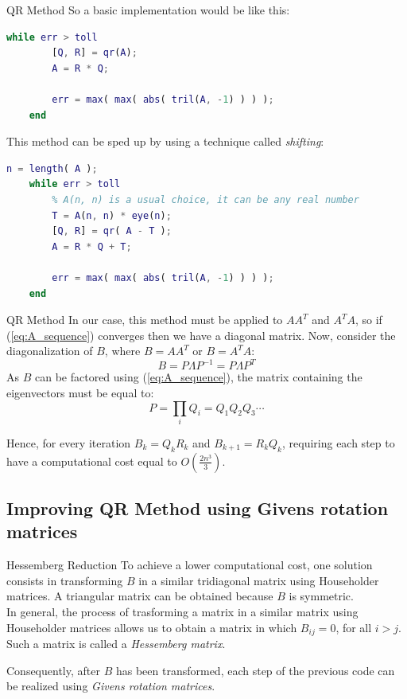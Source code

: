 \documentclass[10pt]{beamer}
\begin{document}
\begin{frame}[fragile]{QR Method}
    So a basic implementation would be like this:
    \begin{lstlisting}[language=Matlab]
    while err > toll
        [Q, R] = qr(A);
        A = R * Q;

        err = max( max( abs( tril(A, -1) ) ) );
    end \end{lstlisting}
    This method can be sped up by using a technique called \textit{shifting}:
    \begin{lstlisting}[language=Matlab]
    n = length( A );
    while err > toll
        % A(n, n) is a usual choice, it can be any real number
        T = A(n, n) * eye(n);
        [Q, R] = qr( A - T );
        A = R * Q + T;

        err = max( max( abs( tril(A, -1) ) ) );
    end \end{lstlisting}
\end{frame}

\begin{frame}{QR Method}
    In our case, this method must be applied to $A A^T$ and $A^T A$, so if (\ref{eq:A_sequence}) converges then we have a diagonal matrix. \newline
    Now, consider the diagonalization of $B$, where $B = A A^T$ or $B = A^T A$:
    $$
    B = P \Lambda P^{-1} =  P \Lambda P^T
    $$
    As $B$ can be factored using (\ref{eq:A_sequence}), the matrix containing the eigenvectors must be equal to:
    $$
    P = \prod_i Q_i = Q_1 Q_2 Q_3 \cdots
    $$ \bigskip

    Hence, for every iteration $B_k = Q_k R_k$ and $B_{k+1} = R_k Q_k$, requiring each step to have a computational cost equal to $O(\frac{2 n^3}{3})$.
\end{frame}

\subsection{Improving QR Method using Givens rotation matrices}

\begin{frame}{Hessemberg Reduction}
    To achieve a lower computational cost, one solution consists in transforming $B$ in a similar tridiagonal matrix using Householder matrices. \newline
    A triangular matrix can be obtained because $B$ is symmetric. \\  \bigskip
    In general, the process of trasforming a matrix in a similar matrix using Householder matrices allows us to obtain a matrix in which $B_{ij} = 0$, for all $i > j$. Such a matrix is called a \textit{Hessemberg matrix}. \bigskip

    Consequently, after $B$ has been transformed, each step of the previous code can be realized using \textit{Givens rotation matrices}.
\end{frame}
\end{document}
